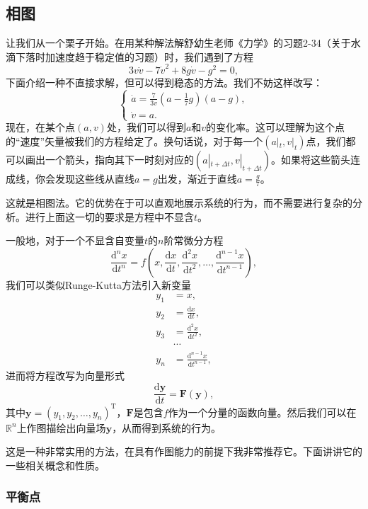 \documentclass[a4paper, 12pt]{article}
\begin{document}
    \subsection{相图}

    让我们从一个栗子开始。在用某种解法解舒幼生老师《力学》的习题2-34（关于水滴下落时加速度趋于稳定值的习题）时，我们遇到了方程
    \[
    3v\ddot v-7\dot v^2+8g\dot v-g^2=0,
    \]
    下面介绍一种不直接求解，但可以得到稳态的方法。我们不妨这样改写：
    \[
    \begin{cases}
        \dot a=\frac{7}{3v}\left(a-\frac{1}{7}g\right)(a-g),\\
        \dot v=a.
    \end{cases}
    \]
    现在，在某个点$(a,v)$处，我们可以得到$a$和$v$的变化率。这可以理解为这个点的“速度”矢量被我们的方程给定了。换句话说，对于每一个$(a|_t,v|_t)$点，我们都可以画出一个箭头，指向其下一时刻对应的$(a|_{t+\Delta t},v|_{t+\Delta t})$。如果将这些箭头连成线，你会发现这些线从直线$a=g$出发，渐近于直线$a=\frac{g}{7}$。

    这就是相图法。它的优势在于可以直观地展示系统的行为，而不需要进行复杂的分析。进行上面这一切的要求是方程中不显含$t$。
    
    一般地，对于一个不显含自变量$t$的$n$阶常微分方程
    \[
    \frac{\mathrm d^n x}{\mathrm dt^n} = f\left(x, \frac{\mathrm dx}{\mathrm dt}, \frac{\mathrm d^2x}{\mathrm dt^2}, \ldots, \frac{\mathrm d^{n-1}x}{\mathrm dt^{n-1}}\right),
    \]
    我们可以类似Runge-Kutta方法引入新变量
    \begin{align*}
        y_1 &= x,\\
        y_2 &= \frac{\mathrm dx}{\mathrm dt},\\
        y_3 &= \frac{\mathrm d^2x}{\mathrm dt^2},\\
        &\cdots\\
        y_n &= \frac{\mathrm d^{n-1}x}{\mathrm dt^{n-1}},
    \end{align*}
    进而将方程改写为向量形式
    \[
    \frac{\mathrm d\boldsymbol y}{\mathrm dt} = \boldsymbol F(\boldsymbol y),
    \]
    其中$\boldsymbol y = (y_1, y_2, \ldots, y_n)^\mathrm T$，$\boldsymbol F$是包含$f$作为一个分量的函数向量。然后我们可以在$\mathbb R^n$上作图描绘出向量场$\boldsymbol y$，从而得到系统的行为。

    这是一种非常实用的方法，在具有作图能力的前提下我非常推荐它。下面讲讲它的一些相关概念和性质。

    \subsubsection{平衡点}
\end{document}
